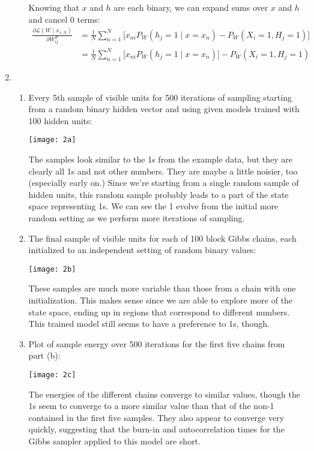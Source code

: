 \documentclass[12pt]{article}
\begin{document}
\begin{enumerate}
\begin{enumerate}
Knowing that $x$ and $h$ are each binary, we can expand sums over $x$ and $h$ and cancel 0 terms:
\begin{align*}
\frac{\partial\mathcal{L}(W\mid x_{1:N})}{\partial W^P_{ij}} &= \frac{1}{N}\sum_{n=1}^N\Bigg[x_{ni}P_W(h_j = 1 \mid x=x_n) - P_W(X_i = 1, H_j = 1)\Bigg]\\
&= \frac{1}{N}\sum_{n=1}^N\Bigg[x_{ni}P_W(h_j = 1 \mid x=x_n)\Bigg] - P_W(X_i = 1, H_j = 1)
\end{align*}

\end{enumerate}

\item %
\begin{enumerate}
\item
Every 5th sample of visible units for 500 iterations of sampling starting from a random binary hidden vector and using given models trained with 100 hidden units:
\begin{center}
\texttt{[image: 2a]}
\end{center}
The samples look similar to the 1s from the example data, but they are clearly all 1s and not other numbers. They are maybe a little noisier, too (especially early on.) Since we're starting from a single random sample of hidden units, this random sample probably leads to a part of the state space representing 1s. We can see the 1 evolve from the initial more random setting as we perform more iterations of sampling.

\item
The final sample of visible units for each of 100 block Gibbs chains, each initialized to an independent setting of random binary values: 
\begin{center}
\texttt{[image: 2b]}
\end{center}
These samples are much more variable than those from a chain with one initialization. This makes sense since we are able to explore more of the state space, ending up in regions that correspond to different numbers. This trained model still seems to have a preference to 1s, though.

\item
Plot of sample energy over 500 iterations for the first five chains from part (b):
\begin{center}
\texttt{[image: 2c]}
\end{center}
The energies of the different chains converge to similar values, though the 1s seem to converge to a more similar value than that of the non-1 contained in the first five samples. They also appear to converge very quickly, suggesting that the burn-in and autocorrelation times for the Gibbs sampler applied to this model are short.


\end{enumerate}
\end{enumerate}
\end{document}
